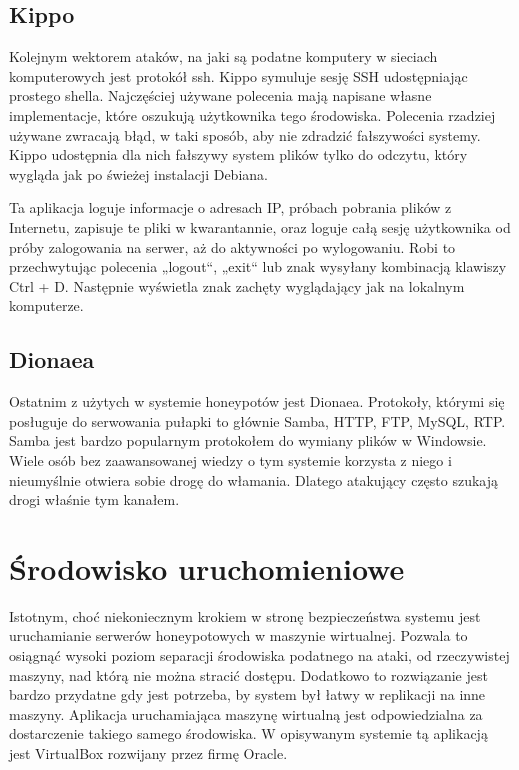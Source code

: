 \documentclass[runningheads,a4paper]{llncs}
\begin{document}
\subsection{Kippo}

Kolejnym wektorem ataków, na jaki są podatne komputery w sieciach komputerowych jest protokół ssh. Kippo symuluje sesję SSH udostępniając prostego shella. Najczęściej używane polecenia mają napisane własne implementacje, które oszukują użytkownika tego środowiska. Polecenia rzadziej używane zwracają błąd, w taki sposób, aby nie zdradzić fałszywości systemy. Kippo udostępnia dla nich fałszywy system plików tylko do odczytu, który wygląda jak po świeżej instalacji Debiana.

Ta aplikacja loguje informacje o adresach IP, próbach pobrania plików z Internetu, zapisuje te pliki w kwarantannie, oraz loguje całą sesję użytkownika od próby zalogowania na serwer, aż do aktywności po wylogowaniu. Robi to przechwytując polecenia „logout“, „exit“ lub znak wysyłany kombinacją klawiszy Ctrl + D. Następnie wyświetla znak zachęty wyglądający jak na lokalnym komputerze.

\subsection{Dionaea}

Ostatnim z użytych w systemie honeypotów jest Dionaea. Protokoły, którymi się posługuje do serwowania pułapki to głównie Samba, HTTP, FTP, MySQL, RTP. Samba jest bardzo popularnym protokołem do wymiany plików w Windowsie. Wiele osób bez zaawansowanej wiedzy o tym systemie korzysta z niego i nieumyślnie otwiera sobie drogę do włamania. Dlatego atakujący często szukają drogi właśnie tym kanałem.

\section{Środowisko uruchomieniowe}

Istotnym, choć niekoniecznym krokiem w stronę bezpieczeństwa systemu jest uruchamianie serwerów honeypotowych w maszynie wirtualnej. Pozwala to osiągnąć wysoki poziom separacji środowiska podatnego na ataki, od rzeczywistej maszyny, nad którą nie można stracić dostępu. Dodatkowo to rozwiązanie jest bardzo przydatne gdy jest potrzeba, by system był łatwy w replikacji na inne maszyny. Aplikacja uruchamiająca maszynę wirtualną jest odpowiedzialna za dostarczenie takiego samego środowiska. W opisywanym systemie tą aplikacją jest VirtualBox rozwijany przez firmę Oracle.
\end{document}
